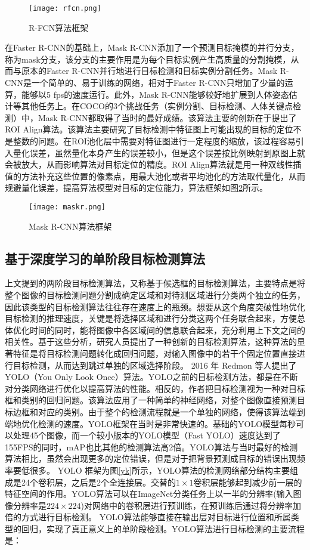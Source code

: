 \begin{figure}[htbp]
    \centering
    \texttt{[image: rfcn.png]}
    \caption{R-FCN算法框架}
    \label{rfcn}
\end{figure}
在Faster R-CNN的基础上，Mask R-CNN添加了一个预测目标掩模的并行分支，称为mask分支，该分支的主要作用是为每个目标实例产生高质量的分割掩模，从而与原本的Faster R-CNN并行地进行目标检测和目标实例分割任务。Mask R-CNN是一个简单的、易于训练的网络，相对于Faster R-CNN只增加了少量的运算，能够以5 fps的速度运行。此外，Mask R-CNN能够较好地扩展到人体姿态估计等其他任务上。在COCO的3个挑战任务（实例分割、目标检测、人体关键点检测）中，Mask R-CNN都取得了当时的最好成绩。该算法主要的创新在于提出了ROI Align算法。该算法主要研究了目标检测中特征图上可能出现的目标的定位不是整数的问题。在ROI池化层中需要对特征图进行一定程度的缩放，该过程容易引入量化误差，虽然量化本身产生的误差较小，但是这个误差按比例映射到原图上就会被放大，从而影响算法对目标定位的精度。ROI Align算法就是用一种双线性插值的方法补充这些位置的像素点，用最大池化或者平均池化的方法取代量化，从而规避量化误差，提高算法模型对目标的定位能力，算法框架如图\ref{maskr}所示。

\begin{figure}[htbp]
    \centering
    \texttt{[image: maskr.png]}
    \caption{Mask R-CNN算法框架}
    \label{maskr}
\end{figure}

\subsection{基于深度学习的单阶段目标检测算法}
上文提到的两阶段目标检测算法，又称基于候选框的目标检测算法，主要特点是将整个图像的目标检测问题分割成确定区域和对待测区域进行分类两个独立的任务，因此该类型的目标检测算法往往存在速度上的瓶颈。想要从这个角度突破性地优化目标检测的推理速度，关键是将选择区域和进行分类这两个任务联合起来，方便总体优化时间的同时，能将图像中各区域间的信息联合起来，充分利用上下文之间的相关性。基于这些分析，研究人员提出了一种创新的目标检测算法，这种算法的显著特征是将目标检测问题转化成回归问题，对输入图像中的若干个固定位置直接进行目标检测，从而达到跳过单独的区域选择阶段\cite{jiao2019survey,wu2020recent}。
2016 年 Redmon 等人提出了 YOLO（You Only Look Once）算法\cite{redmon2016you}。YOLO之前的目标检测方法，都是在不断对分类网络进行优化以提高算法的性能。相反的，作者把目标检测视为一种对目标框和类别的回归问题。该算法应用了一种简单的神经网络，对整个图像直接预测目标边框和对应的类别。由于整个的检测流程就是一个单独的网络，使得该算法端到端地优化检测的速度。YOLO框架在当时是非常快速的。基础的YOLO模型每秒可以处理45个图像，而一个较小版本的YOLO模型（Fast YOLO）速度达到了155FPS的同时，mAP也比其他的检测算法高2倍。YOLO算法与当时最好的检测算法相比，虽然会出现更多的定位错误，但是对于把背景预测成目标的错误出现频率要低很多。
YOLO 框架为图\ref{yk}所示，YOLO算法的检测网络部分结构主要组成是24个卷积层，之后是2个全连接层。交替的$1\times1$卷积层能够起到减少前一层的特征空间的作用。YOLO算法可以在ImageNet分类任务上以一半的分辨率(输入图像分辨率是$224\times224$)对网络中的卷积层进行预训练，在预训练后通过将分辨率加倍的方式进行目标检测。
YOLO算法能够直接在输出层对目标进行位置和所属类型的回归，实现了真正意义上的单阶段检测。YOLO算法进行目标检测的主要流程是：

